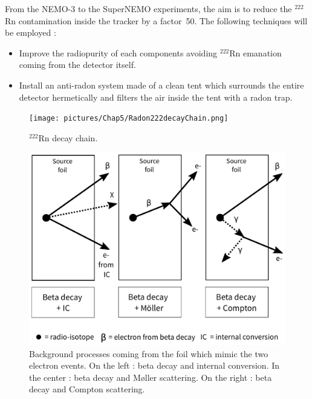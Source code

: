 \documentclass[main.tex]{subfiles}
\begin{document}
\bigskip


\noindent From the NEMO-3 to the SuperNEMO experiments, the aim is to reduce the $^{\text{222}}$Rn contamination inside the tracker by a factor~50. The following techniques will be employed :


\begin{itemize}

\item Improve the radiopurity of each components avoiding $^{\text{222}}$Rn emanation coming from the detector itself.

\item Install an anti-radon system made of a clean tent which surrounds the entire detector hermetically and filters the air inside the tent with a radon trap. 

\end{itemize}


\begin{figure}[h!]
\begin{center}
\texttt{[image: pictures/Chap5/Radon222decayChain.png]}
\caption{$^{\text{222}}$Rn decay chain.}
\label{Radon222decayChain}
\end{center}
\end{figure}


\begin{figure}[h!]
\begin{center}
\includegraphics[scale=0.4]{pictures/Chap5/internal_bkg.pdf}
\caption{Background processes coming from the foil which mimic the two electron events. On the left : beta decay and internal conversion. In the center : beta decay and M\o ller scattering. On the right : beta decay and Compton scattering.}
\label{Backgroungs}
\end{center}
\end{figure}
\end{document}
